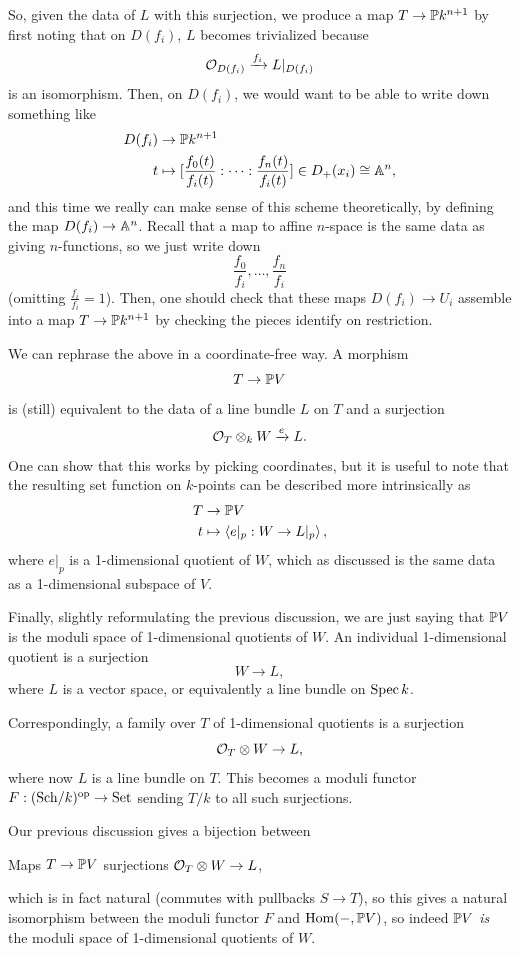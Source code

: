 \documentclass[12pt]{article}
\begin{document}
\begin{rmk}
    So, given the data of $L$ with this surjection, we produce a map $T\to \P k^{n+1}$ by first noting that on $D(f_i)$, $L$ becomes trivialized because
    \[\cO_{D(f_i)} \xrightarrow{f_i} L|_{D(f_i)}\]
    is an isomorphism. Then, on $D(f_i)$, we would want to be able to write down something like
    \begin{align*}
        D(f_i) &\to \P k^{n+1}\\
        t &\mapsto [\frac{f_0(t)}{f_i(t)}: \cdots : \frac{f_{n}(t)}{f_i(t)}] \in D_+(x_i) \cong \A^n,
    \end{align*}
    and this time we really can make sense of this scheme theoretically, by defining the map $D(f_i) \to \A^n$. Recall that a map to affine $n$-space is the same data as giving $n$-functions, so we just write down
    \[\frac{f_0}{f_i},\dots,\frac{f_n}{f_i}\]
    (omitting $\frac{f_i}{f_i}=1$). Then, one should check that these maps $D(f_i)\to U_i$ assemble into a map $T\to \P k^{n+1}$ by checking the pieces identify on restriction.
\end{rmk}

\begin{rmk}
    We can rephrase the above in a coordinate-free way. A morphism
    \[T \to \P V\]
    is (still) equivalent to the data of a line bundle $L$ on $T$ and a surjection
    \[\cO_T \otimes_k W \xrightarrow{e} L.\]
    One can show that this works by picking coordinates, but it is useful to note that the resulting set function on $k$-points can be described more intrinsically as
    \begin{align*}
        T &\to \P V\\
        t &\mapsto \<e|_p: W \to L|_p\>,
    \end{align*}
    where $e|_p$ is a 1-dimensional quotient of $W$, which as discussed is the same data as a 1-dimensional subspace of $V$.
\end{rmk}


Finally, slightly reformulating the previous discussion, we are just saying that $\P V$ is the moduli space of 1-dimensional quotients of $W$. An individual 1-dimensional quotient is a surjection
\[W \to L,\]
where $L$ is a vector space, or equivalently a line bundle on $\Spec k$.

Correspondingly, a family over $T$ of 1-dimensional quotients is a surjection
\[\cO_T \otimes W \to L,\]
where now $L$ is a line bundle on $T$. This becomes a moduli functor $F: (\Sch/k)^\op \to \Set$ sending $T/k$ to all such surjections.

Our previous discussion gives a bijection between
\begin{center}
    Maps $T\to \P V$ \qquad surjections $\cO_T \otimes W \to L$,
\end{center}
which is in fact natural (commutes with pullbacks $S\to T$), so this gives a natural isomorphism between the moduli functor $F$ and $\Hom(-,\P V)$, so indeed $\P V$ \textit{is} the moduli space of 1-dimensional quotients of $W$.
\end{document}
